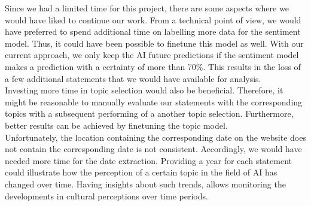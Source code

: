 Since we had a limited time for this project, there are some aspects where we would have liked to continue our work.
From a technical point of view, we would have preferred to spend additional time on labelling more data for the sentiment model.
Thus, it could have been possible to finetune this model as well.
With our current approach, we only keep the AI future predictions if the sentiment model makes a prediction with a certainty of more than 70\%.
This results in the loss of a few additional statements that we would have available for analysis.
\\
Investing more time in topic selection would also be beneficial.
Therefore, it might be reasonable to manually evaluate our statements with the corresponding topics with a subsequent performing of a another topic selection.
Furthermore, better results can be achieved by finetuning the topic model.
\\
Unfortunately, the location containing the corresponding date on the website does not contain the corresponding date is not consistent.
Accordingly, we would have needed more time for the date extraction.
Providing a year for each statement could illustrate how the perception of a certain topic in the field of AI has changed over time.
Having insights about such trends, allows monitoring the developments in cultural perceptions over time periods.
\\





